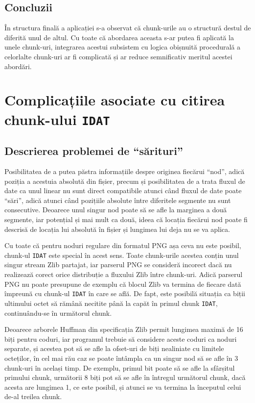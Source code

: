 \documentclass[a4paper,12pt]{report}
\begin{document}
\subsection{Concluzii}

În structura finală a aplicației s-a observat că chunk-urile au o structură destul de diferită unul de altul.
Cu toate că abordarea aceasta s-ar putea fi aplicată la unele chunk-uri,
integrarea acestui subsistem cu logica obișnuită procedurală a celorlalte chunk-uri
ar fi complicată și ar reduce semnificativ meritul acestei abordări. 

\section{Complicațiile asociate cu citirea chunk-ului \texttt{IDAT}}

\subsection{Descrierea problemei de ``sărituri''}

Posibilitatea de a putea păstra informațiile despre originea fiecărui ``nod'',
adică poziția a acestuia absolută din fișier,
precum și posibilitatea de a trata fluxul de date ca unul linear nu sunt direct compatibile
atunci când fluxul de date poate ``sări'', adică atunci când pozițiile absolute
între diferitele segmente nu sunt consecutive.
Deoarece unul singur nod poate să se afle la marginea a două segmente, iar potențial și mai mult ca două,
ideea că locația fiecărui nod poate fi descrisă de locația lui absolută în fișier și
lungimea lui deja nu se va aplica.

Cu toate că pentru noduri regulare din formatul \ac{PNG} așa ceva nu este posibil,
chunk-ul \texttt{IDAT} este special în acest sens.
Toate chunk-urile acestea conțin unul singur stream Zlib partajat,
iar parserul \ac{PNG} se consideră incorect dacă nu realizează corect
orice distribuție a fluxului Zlib între chunk-uri.
Adică parserul \ac{PNG} nu poate presupune de exemplu că blocul Zlib va termina de fiecare dată
împreună cu chunk-ul \texttt{IDAT} în care se află.
De fapt, este posibilă situația ca biții ultimului octet să rămână necitite până la capăt
în primul chunk \texttt{IDAT}, continuându-se în următorul chunk.

Deoarece arborele Huffman din specificația Zlib permit lungimea maximă de 16 biți pentru coduri,
iar programul trebuie să considere aceste coduri ca noduri separate,
și acestea pot să se afle la ofset-uri de biți nealiniate cu limitele octeților,
în cel mai rău caz se poate întâmpla ca un singur nod să se afle în 3 chunk-uri în același timp.
De exemplu, primul bit poate să se afle la sfârșitul primului chunk,
următorii 8 biți pot să se afle în întregul următorul chunk, dacă acesta are lungimea 1, ce este posibil,
și atunci se va termina la începutul celui de-al treilea chunk.
\end{document}
